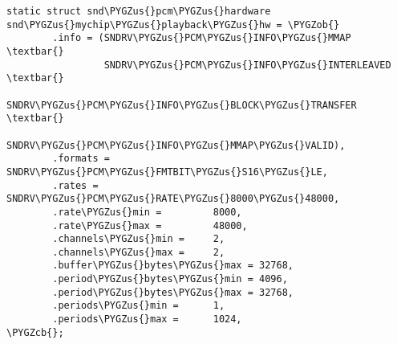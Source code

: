 \documentclass[a4paper,8pt,english]{sphinxmanual}
\def\PYGZus{\char`\_}
\def\PYGZob{\char`\{}
\def\PYGZcb{\char`\}}
\begin{document}
\begin{Verbatim}[commandchars=\\\{\}]
static struct snd\PYGZus{}pcm\PYGZus{}hardware snd\PYGZus{}mychip\PYGZus{}playback\PYGZus{}hw = \PYGZob{}
        .info = (SNDRV\PYGZus{}PCM\PYGZus{}INFO\PYGZus{}MMAP \textbar{}
                 SNDRV\PYGZus{}PCM\PYGZus{}INFO\PYGZus{}INTERLEAVED \textbar{}
                 SNDRV\PYGZus{}PCM\PYGZus{}INFO\PYGZus{}BLOCK\PYGZus{}TRANSFER \textbar{}
                 SNDRV\PYGZus{}PCM\PYGZus{}INFO\PYGZus{}MMAP\PYGZus{}VALID),
        .formats =          SNDRV\PYGZus{}PCM\PYGZus{}FMTBIT\PYGZus{}S16\PYGZus{}LE,
        .rates =            SNDRV\PYGZus{}PCM\PYGZus{}RATE\PYGZus{}8000\PYGZus{}48000,
        .rate\PYGZus{}min =         8000,
        .rate\PYGZus{}max =         48000,
        .channels\PYGZus{}min =     2,
        .channels\PYGZus{}max =     2,
        .buffer\PYGZus{}bytes\PYGZus{}max = 32768,
        .period\PYGZus{}bytes\PYGZus{}min = 4096,
        .period\PYGZus{}bytes\PYGZus{}max = 32768,
        .periods\PYGZus{}min =      1,
        .periods\PYGZus{}max =      1024,
\PYGZcb{};
\end{Verbatim}
\end{document}
